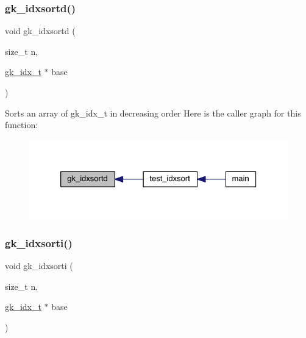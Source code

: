 \subsubsection{\texorpdfstring{gk\+\_\+idxsortd()}{gk\_idxsortd()}}
{\footnotesize\ttfamily void gk\+\_\+idxsortd (\begin{DoxyParamCaption}\item[{size\+\_\+t}]{n,  }\item[{\hyperlink{a00083_a899f9d8c47b1ca0c2fead41097f4bde2}{gk\+\_\+idx\+\_\+t} $\ast$}]{base }\end{DoxyParamCaption})}

Sorts an array of gk\+\_\+idx\+\_\+t in decreasing order Here is the caller graph for this function\+:\nopagebreak
\begin{figure}[H]
\begin{center}
\leavevmode
\includegraphics[width=326pt]{a00077_a77534ffafbfc5bebe4b527548d60a1ee_icgraph}
\end{center}
\end{figure}
\mbox{\label{a00077_ad863e6e90eb4028e89bfb66e8d8a3c08}} 
\subsubsection{\texorpdfstring{gk\+\_\+idxsorti()}{gk\_idxsorti()}}
{\footnotesize\ttfamily void gk\+\_\+idxsorti (\begin{DoxyParamCaption}\item[{size\+\_\+t}]{n,  }\item[{\hyperlink{a00083_a899f9d8c47b1ca0c2fead41097f4bde2}{gk\+\_\+idx\+\_\+t} $\ast$}]{base }\end{DoxyParamCaption})}

